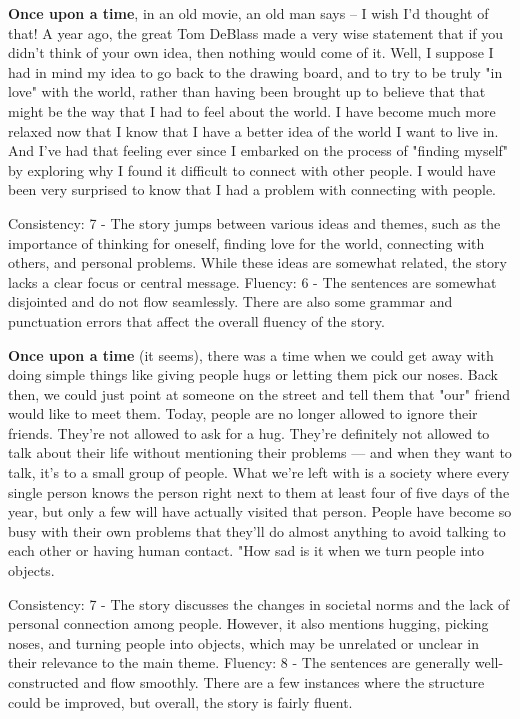 \documentclass{article}
\begin{document}
\textbf{Once upon a time}, in an old movie, an old man says – I wish I'd thought of that! A year ago, the great Tom DeBlass made a very wise statement that if you didn't think of your own idea, then nothing would come of it. Well, I suppose I had in mind my idea to go back to the drawing board, and to try to be truly "in love" with the world, rather than having been brought up to believe that that might be the way that I had to feel about the world. I have become much more relaxed now that I know that I have a better idea of the world I want to live in. And I've had that feeling ever since I embarked on the process of "finding myself" by exploring why I found it difficult to connect with other people. I would have been very surprised to know that I had a problem with connecting with people.

Consistency: 7 - The story jumps between various ideas and themes, such as the importance of thinking for oneself, finding love for the world, connecting with others, and personal problems. While these ideas are somewhat related, the story lacks a clear focus or central message.
Fluency: 6 - The sentences are somewhat disjointed and do not flow seamlessly. There are also some grammar and punctuation errors that affect the overall fluency of the story.

\textbf{Once upon a time} (it seems), there was a time when we could get away with doing simple things like giving people hugs or letting them pick our noses. Back then, we could just point at someone on the street and tell them that "our" friend would like to meet them. Today, people are no longer allowed to ignore their friends. They're not allowed to ask for a hug. They're definitely not allowed to talk about their life without mentioning their problems — and when they want to talk, it's to a small group of people. What we're left with is a society where every single person knows the person right next to them at least four of five days of the year, but only a few will have actually visited that person. People have become so busy with their own problems that they'll do almost anything to avoid talking to each other or having human contact. "How sad is it when we turn people into objects.

Consistency: 7 - The story discusses the changes in societal norms and the lack of personal connection among people. However, it also mentions hugging, picking noses, and turning people into objects, which may be unrelated or unclear in their relevance to the main theme.
Fluency: 8 - The sentences are generally well-constructed and flow smoothly. There are a few instances where the structure could be improved, but overall, the story is fairly fluent.
\end{document}
